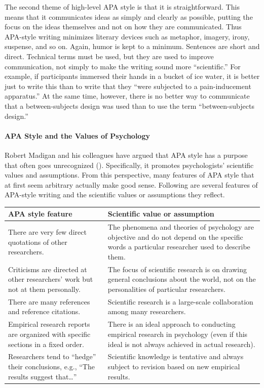 \documentclass[
]{krantz}
\begin{document}
The second theme of high-level APA style is that it is straightforward. This means that it communicates ideas as simply and clearly as possible, putting the focus on the ideas themselves and not on how they are communicated. Thus APA-style writing minimizes literary devices such as metaphor, imagery, irony, suspense, and so on. Again, humor is kept to a minimum. Sentences are short and direct. Technical terms must be used, but they are used to improve communication, not simply to make the writing sound more ``scientific.'' For example, if participants immersed their hands in a bucket of ice water, it is better just to write this than to write that they ``were subjected to a pain-inducement apparatus.'' At the same time, however, there is no better way to communicate that a between-subjects design was used than to use the term ``between-subjects design.''

\paragraph*{APA Style and the Values of Psychology}\label{apa-style-and-the-values-of-psychology}

Robert Madigan and his colleagues have argued that APA style has a purpose that often goes unrecognized (). Specifically, it promotes psychologists' scientific values and assumptions. From this perspective, many features of APA style that at first seem arbitrary actually make good sense. Following are several features of APA-style writing and the scientific values or assumptions they reflect.

\begin{tabular}{l|l}
\hline
APA style feature & Scientific value or assumption\\
\hline
There are very few direct quotations of other researchers. & The phenomena and theories of psychology are objective and do not depend on the specific words a particular researcher used to describe them.\\
\hline
Criticisms are directed at other researchers’ work but not at them personally. & The focus of scientific research is on drawing general conclusions about the world, not on the personalities of particular researchers.\\
\hline
There are many references and reference citations. & Scientific research is a large-scale collaboration among many researchers.\\
\hline
Empirical research reports are organized with specific sections in a fixed order. & There is an ideal approach to conducting empirical research in psychology (even if this ideal is not always achieved in actual research).\\
\hline
Researchers tend to “hedge” their conclusions, e.g., “The results suggest that…” & Scientific knowledge is tentative and always subject to revision based on new empirical results.\\
\hline
\end{tabular}
\end{document}
